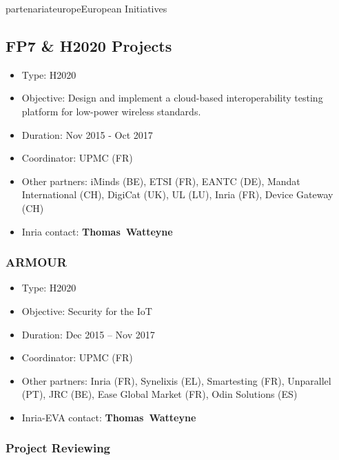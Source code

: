 \documentclass{ra2016}
\newcommand{\thomas}  {\textbf{Thomas~Watteyne}}
\begin{document}
\begin{module}{partenariat}{europe}{European Initiatives}


\subsection{FP7 \& H2020 Projects}
\begin{itemize}
    \item Type: H2020
    \item Objective: Design and implement a cloud-based interoperability testing platform for low-power wireless standards.
    \item Duration: Nov 2015 - Oct 2017
    \item Coordinator: UPMC (FR)
    \item Other partners: iMinds (BE), ETSI (FR), EANTC (DE), Mandat International (CH), DigiCat (UK), UL (LU), Inria (FR), Device Gateway (CH)
    \item Inria contact: \thomas
\end{itemize}

\subsubsection{ARMOUR}

\begin{itemize}
    \item Type: H2020
    \item Objective: Security for the IoT
    \item Duration: Dec 2015 – Nov 2017
    \item Coordinator: UPMC (FR)
    \item Other partners: Inria (FR), Synelixis (EL), Smartesting (FR), Unparallel (PT), JRC (BE), Ease Global Market (FR), Odin Solutions (ES)
    \item Inria-EVA contact: \thomas
\end{itemize}

%
\subsubsection{Project Reviewing} 


\end{module}
\end{document}
